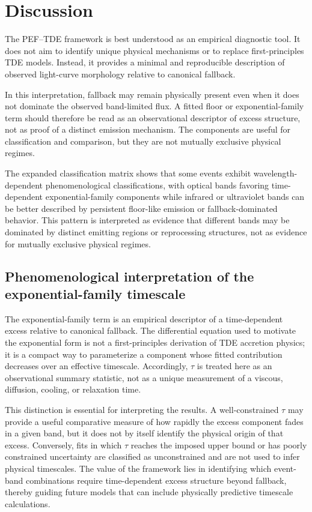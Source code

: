 \documentclass[11pt]{article}
\begin{document}
\section{Discussion}

The PEF--TDE framework is best understood as an empirical diagnostic tool. It does not aim to identify unique physical mechanisms or to replace first-principles TDE models. Instead, it provides a minimal and reproducible description of observed light-curve morphology relative to canonical fallback.

In this interpretation, fallback may remain physically present even when it does not dominate the observed band-limited flux. A fitted floor or exponential-family term should therefore be read as an observational descriptor of excess structure, not as proof of a distinct emission mechanism. The components are useful for classification and comparison, but they are not mutually exclusive physical regimes.

The expanded classification matrix shows that some events exhibit wavelength-dependent phenomenological classifications, with optical bands favoring time-dependent exponential-family components while infrared or ultraviolet bands can be better described by persistent floor-like emission or fallback-dominated behavior. This pattern is interpreted as evidence that different bands may be dominated by distinct emitting regions or reprocessing structures, not as evidence for mutually exclusive physical regimes.

\subsection{Phenomenological interpretation of the exponential-family timescale}
The exponential-family term is an empirical descriptor of a time-dependent excess relative to canonical fallback. The differential equation used to motivate the exponential form is not a first-principles derivation of TDE accretion physics; it is a compact way to parameterize a component whose fitted contribution decreases over an effective timescale. Accordingly, $\tau$ is treated here as an observational summary statistic, not as a unique measurement of a viscous, diffusion, cooling, or relaxation time.

This distinction is essential for interpreting the results. A well-constrained $\tau$ may provide a useful comparative measure of how rapidly the excess component fades in a given band, but it does not by itself identify the physical origin of that excess. Conversely, fits in which $\tau$ reaches the imposed upper bound or has poorly constrained uncertainty are classified as unconstrained and are not used to infer physical timescales. The value of the framework lies in identifying which event-band combinations require time-dependent excess structure beyond fallback, thereby guiding future models that can include physically predictive timescale calculations.
\end{document}
